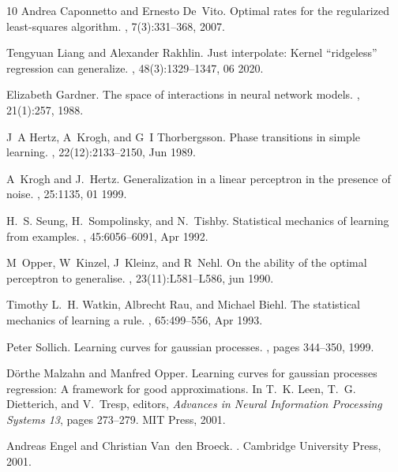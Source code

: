 \documentclass[11pt]{article}
\begin{document}
\begin{thebibliography}{10}
Andrea Caponnetto and Ernesto De~Vito.
\newblock Optimal rates for the regularized least-squares algorithm.
, 7(3):331--368, 2007.

Tengyuan Liang and Alexander Rakhlin.
\newblock Just interpolate: Kernel “ridgeless” regression can generalize.
, 48(3):1329--1347, 06 2020.

Elizabeth Gardner.
\newblock The space of interactions in neural network models.
, 21(1):257,
  1988.

J~A Hertz, A~Krogh, and G~I Thorbergsson.
\newblock Phase transitions in simple learning.
,
  22(12):2133--2150, Jun 1989.

A~Krogh and J.~Hertz.
\newblock Generalization in a linear perceptron in the presence of noise.
, 25:1135, 01
  1999.

H.~S. Seung, H.~Sompolinsky, and N.~Tishby.
\newblock Statistical mechanics of learning from examples.
, 45:6056--6091, Apr 1992.

M~Opper, W~Kinzel, J~Kleinz, and R~Nehl.
\newblock On the ability of the optimal perceptron to generalise.
,
  23(11):L581--L586, jun 1990.

Timothy L.~H. Watkin, Albrecht Rau, and Michael Biehl.
\newblock The statistical mechanics of learning a rule.
, 65:499--556, Apr 1993.

Peter Sollich.
\newblock Learning curves for gaussian processes.
, pages
  344--350, 1999.

D\"{o}rthe Malzahn and Manfred Opper.
\newblock Learning curves for gaussian processes regression: A framework for
  good approximations.
\newblock In T.~K. Leen, T.~G. Dietterich, and V.~Tresp, editors, {\em Advances
  in Neural Information Processing Systems 13}, pages 273--279. MIT Press,
  2001.

Andreas Engel and Christian Van~den Broeck.
.
\newblock Cambridge University Press, 2001.


\end{thebibliography}
\end{document}
